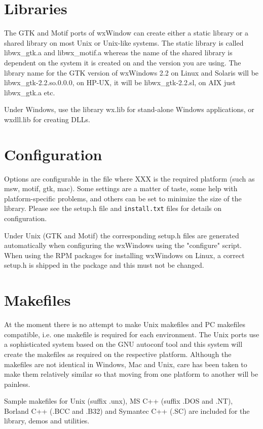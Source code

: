 \section{Libraries}

The GTK and Motif ports of wxWindow can create either a static library or a shared
library on most Unix or Unix-like systems. The static library is called libwx_gtk.a
and libwx_motif.a whereas the name of the shared library is dependent on the
system it is created on and the version you are using. The library name for the
GTK version of wxWindows 2.2 on Linux and Solaris will be libwx_gtk-2.2.so.0.0.0,
on HP-UX, it will be libwx_gtk-2.2.sl, on AIX just libwx_gtk.a etc.

Under Windows, use the library wx.lib for stand-alone Windows
applications, or wxdll.lib for creating DLLs.

\section{Configuration}

Options are configurable in the file
 where XXX is the required platform (such as msw, motif, gtk, mac). Some 
settings are a matter of taste, some help with platform-specific problems, and
others can be set to minimize the size of the library. Please see the setup.h file
and {\tt install.txt} files for details on configuration.

Under Unix (GTK and Motif) the corresponding setup.h files are generated automatically
when configuring the wxWindows using the "configure" script. When using the RPM packages
for installing wxWindows on Linux, a correct setup.h is shipped in the package and
this must not be changed.

\section{Makefiles}

At the moment there is no attempt to make Unix makefiles and
PC makefiles compatible, i.e. one makefile is required for
each environment. The Unix ports use a sophisticated system based
on the GNU autoconf tool and this system will create the
makefiles as required on the respective platform. Although the
makefiles are not identical in Windows, Mac and Unix, care has
been taken to make them relatively similar so that moving from
one platform to another will be painless.

Sample makefiles for Unix (suffix .unx), MS C++ (suffix .DOS and .NT), Borland
C++ (.BCC and .B32) and Symantec C++ (.SC) are included for the library, demos
and utilities.


